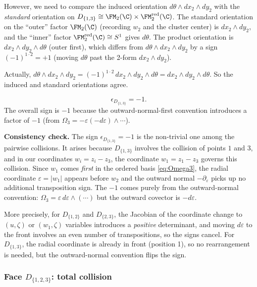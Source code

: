 However, we need to compare the induced orientation $d\theta\wedge dx_2\wedge dy_2$ with the \emph{standard} orientation on $D_{\{1,3\}} \cong \FM_2(\C)\times \FM_2^{\mathrm{red}}(\C)$. The standard orientation on the ``outer'' factor $\FM_2(\C)$ (recording $w_2$ and the cluster center) is $dx_2\wedge dy_2$, and the ``inner'' factor $\FM_2^{\mathrm{red}}(\C) \cong S^1$ gives $d\theta$. The product orientation is $dx_2\wedge dy_2\wedge d\theta$ (outer first), which differs from $d\theta\wedge dx_2\wedge dy_2$ by a sign $(-1)^{1\cdot 2} = +1$ (moving $d\theta$ past the 2-form $dx_2\wedge dy_2$).

Actually, $d\theta\wedge dx_2\wedge dy_2 = (-1)^{1\cdot 2}\,dx_2\wedge dy_2\wedge d\theta = dx_2\wedge dy_2\wedge d\theta$. So the induced and standard orientations agree.

\begin{equation}
\label{eq:eps-D13}
\boxed{\epsilon_{D_{\{1,3\}}} = -1.}
\end{equation}
The overall sign is $-1$ because the outward-normal-first convention introduces a factor of $-1$ (from $\Omega_3 = -\varepsilon(-d\varepsilon)\wedge\cdots$).

\noindent\textbf{Consistency check.} The sign $\epsilon_{D_{\{1,3\}}} = -1$ is the non-trivial one among the pairwise collisions. It arises because $D_{\{1,3\}}$ involves the collision of points $1$ and $3$, and in our coordinates $w_i = z_i - z_3$, the coordinate $w_1 = z_1 - z_3$ governs this collision. Since $w_1$ comes \emph{first} in the ordered basis \eqref{eq:Omega3}, the radial coordinate $\varepsilon = |w_1|$ appears before $w_2$ and the outward normal $-\partial_\varepsilon$ picks up no additional transposition sign. The $-1$ comes purely from the outward-normal convention: $\Omega_3 = \varepsilon\,d\varepsilon\wedge(\cdots)$ but the outward covector is $-d\varepsilon$.

More precisely, for $D_{\{1,2\}}$ and $D_{\{2,3\}}$, the Jacobian of the coordinate change to $(u,\zeta)$ or $(w_1,\zeta)$ variables introduces a \emph{positive} determinant, and moving $d\varepsilon$ to the front involves an even number of transpositions, so the signs cancel. For $D_{\{1,3\}}$, the radial coordinate is already in front (position 1), so no rearrangement is needed, but the outward-normal convention flips the sign.

\subsubsection{Face $D_{\{1,2,3\}}$: total collision}

